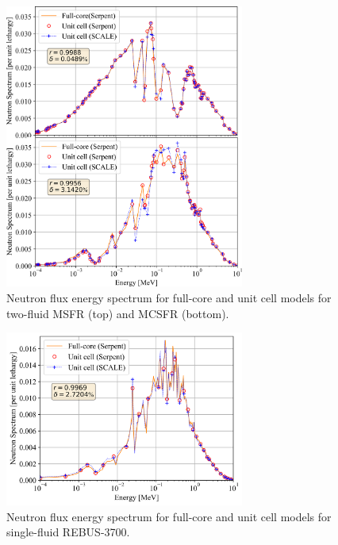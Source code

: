 \documentclass[letterpaper]{mandc2019}
\begin{document}
\begin{figure}[!htb]
  \centering
  \includegraphics[width=0.7\textwidth]{./Figures/two_full_vs_unit_spectrum.png}
  \caption{Neutron flux energy spectrum for full-core and unit cell models for two-fluid \gls{MSFR} (top) and \gls{MCSFR} (bottom).}
  \label{fig:spectrum_two}
\end{figure}
\begin{figure}[!htb]
  \centering
  \includegraphics[width=0.7\textwidth]{./Figures/rebus_full_vs_unit_spectrum.png}
  \caption{Neutron flux energy spectrum for full-core and unit cell models for single-fluid REBUS-3700.}
  \label{fig:spectrum_rebus}
\end{figure}
\end{document}
